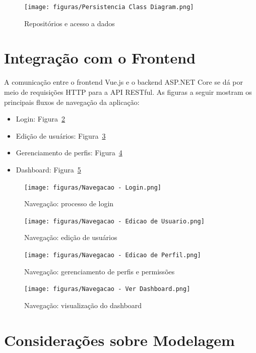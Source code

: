 \begin{figure}[H]
    \centering
    \texttt{[image: figuras/Persistencia Class Diagram.png]}
    \caption{Repositórios e acesso a dados}
    \label{figura-persistencia}
\end{figure}

\section{Integração com o Frontend}

A comunicação entre o frontend Vue.js e o backend ASP.NET Core se dá por meio de requisições HTTP para a API RESTful. As figuras a seguir mostram os principais fluxos de navegação da aplicação:

\begin{itemize}
    \item Login: Figura~\ref{fig-navegacao-login}
    \item Edição de usuários: Figura~\ref{fig-navegacao-usuario}
    \item Gerenciamento de perfis: Figura~\ref{fig-navegacao-perfil}
    \item Dashboard: Figura~\ref{fig-navegacao-dashboard}
\end{itemize}

\begin{figure}[H]
    \centering
    \texttt{[image: figuras/Navegacao - Login.png]}
    \caption{Navegação: processo de login}
    \label{fig-navegacao-login}
\end{figure}

\begin{figure}[H]
    \centering
    \texttt{[image: figuras/Navegacao - Edicao de Usuario.png]}
    \caption{Navegação: edição de usuários}
    \label{fig-navegacao-usuario}
\end{figure}

\begin{figure}[H]
    \centering
    \texttt{[image: figuras/Navegacao - Edicao de Perfil.png]}
    \caption{Navegação: gerenciamento de perfis e permissões}
    \label{fig-navegacao-perfil}
\end{figure}

\begin{figure}[H]
    \centering
    \texttt{[image: figuras/Navegacao - Ver Dashboard.png]}
    \caption{Navegação: visualização do dashboard}
    \label{fig-navegacao-dashboard}
\end{figure}

\section{Considerações sobre Modelagem}

